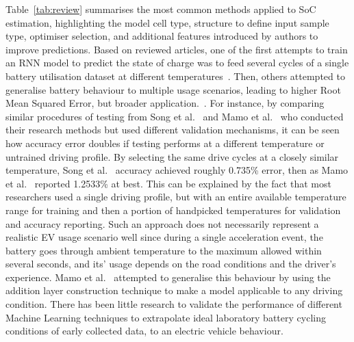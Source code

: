 \mbox{Table~\ref{tab:review}} summarises the most common methods applied to SoC estimation, highlighting the model cell type, structure to define input sample type, optimiser selection, and additional features introduced by authors to improve predictions.
Based on reviewed articles, one of the first attempts to train an RNN model to predict the state of charge was to feed several cycles of a single battery utilisation dataset at different temperatures~\cite{song_lithium-ion_2018, xiao_accurate_2019,javid_adaptive_2020, jiao_gru-rnn_2020}.
Then, others attempted to generalise battery behaviour to multiple usage scenarios, leading to higher Root Mean Squared Error, but broader application.~\cite{mamo_long_2020}.
For instance, by comparing similar procedures of testing from Song et al.~\cite{song_lithium-ion_2018} and Mamo et al.~\cite{mamo_long_2020} who conducted their research methods but used different validation mechanisms, it can be seen how accuracy error doubles if testing performs at a different temperature or untrained driving profile.
By selecting the same drive cycles at a closely similar temperature, Song et al.~\cite{song_lithium-ion_2018} accuracy achieved roughly 0.735\% error, then as Mamo et al.~\cite{mamo_long_2020} reported 1.2533\% at best.
This can be explained by the fact that most researchers used a single driving profile, but with an entire available temperature range for training and then a portion of handpicked temperatures for validation and accuracy reporting.
Such an approach does not necessarily represent a realistic EV usage scenario well since during a single acceleration event, the battery goes through ambient temperature to the maximum allowed within several seconds, and its' usage depends on the road conditions and the driver's experience.
Mamo et al.~\cite{mamo_long_2020} attempted to generalise this behaviour by using the addition layer construction technique to make a model applicable to any driving condition.
There has been little research to validate the performance of different Machine Learning techniques to extrapolate ideal laboratory battery cycling conditions of early collected data, to an electric vehicle behaviour.
